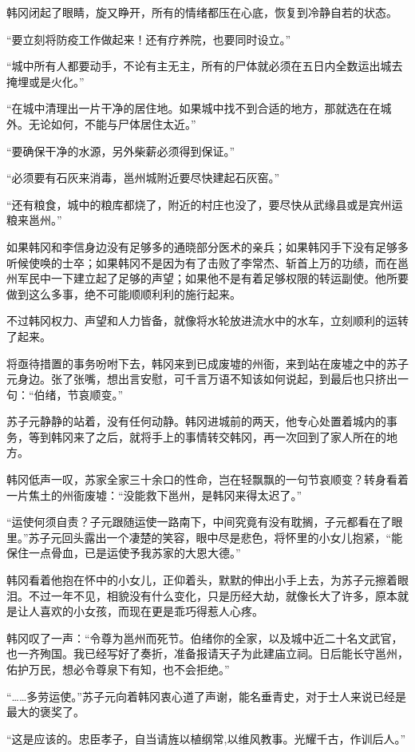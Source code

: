 韩冈闭起了眼睛，旋又睁开，所有的情绪都压在心底，恢复到冷静自若的状态。

“要立刻将防疫工作做起来！还有疗养院，也要同时设立。”

“城中所有人都要动手，不论有主无主，所有的尸体就必须在五日内全数运出城去掩埋或是火化。”

“在城中清理出一片干净的居住地。如果城中找不到合适的地方，那就选在在城外。无论如何，不能与尸体居住太近。”

“要确保干净的水源，另外柴薪必须得到保证。”

“必须要有石灰来消毒，邕州城附近要尽快建起石灰窑。”

“还有粮食，城中的粮库都烧了，附近的村庄也没了，要尽快从武缘县或是宾州运粮来邕州。”

如果韩冈和李信身边没有足够多的通晓部分医术的亲兵；如果韩冈手下没有足够多听候使唤的士卒；如果韩冈不是因为有了击败了李常杰、斩首上万的功绩，而在邕州军民中一下建立起了足够的声望；如果他不是有着足够权限的转运副使。他所要做到这么多事，绝不可能顺顺利利的施行起来。

不过韩冈权力、声望和人力皆备，就像将水轮放进流水中的水车，立刻顺利的运转了起来。

将亟待措置的事务吩咐下去，韩冈来到已成废墟的州衙，来到站在废墟之中的苏子元身边。张了张嘴，想出言安慰，可千言万语不知该如何说起，到最后也只挤出一句：“伯绪，节哀顺变。”

苏子元静静的站着，没有任何动静。韩冈进城前的两天，他专心处置着城内的事务，等到韩冈来了之后，就将手上的事情转交韩冈，再一次回到了家人所在的地方。

韩冈低声一叹，苏家全家三十余口的性命，岂在轻飘飘的一句节哀顺变？转身看着一片焦土的州衙废墟：“没能救下邕州，是韩冈来得太迟了。”

“运使何须自责？子元跟随运使一路南下，中间究竟有没有耽搁，子元都看在了眼里。”苏子元回头露出一个凄楚的笑容，眼中尽是悲色，将怀里的小女儿抱紧，“能保住一点骨血，已是运使予我苏家的大恩大德。”

韩冈看着他抱在怀中的小女儿，正仰着头，默默的伸出小手上去，为苏子元擦着眼泪。不过一年不见，相貌没有什么变化，只是历经大劫，就像长大了许多，原本就是让人喜欢的小女孩，而现在更是乖巧得惹人心疼。

韩冈叹了一声：“令尊为邕州而死节。伯绪你的全家，以及城中近二十名文武官，也一齐殉国。我已经写好了奏折，准备报请天子为此建庙立祠。日后能长守邕州，佑护万民，想必令尊泉下有知，也不会拒绝。”

“……多劳运使。”苏子元向着韩冈衷心道了声谢，能名垂青史，对于士人来说已经是最大的褒奖了。

“这是应该的。忠臣孝子，自当请旌以植纲常,以维风教事。光耀千古，作训后人。”

